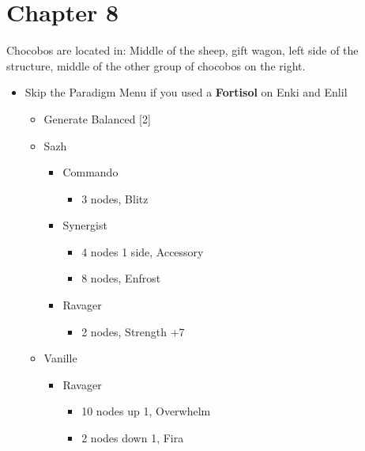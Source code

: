 \chapter{Chapter 8}

	Chocobos are located in: Middle of the sheep, gift wagon, left side of the structure, middle of the other group of chocobos on the right.
	\begin{menu}
		\begin{itemize}
			\item Skip the Paradigm Menu if you used a \textbf{Fortisol} on Enki and Enlil
			      \paradigm
			      \begin{itemize}
			      		\item Generate Balanced [2]
			      \end{itemize}
			      \crystarium
			      \begin{itemize}
				      \item Sazh
				            \begin{itemize}
					            \item Commando
					                  \begin{itemize}
						                  \item 3 nodes, Blitz
					                  \end{itemize}
					            \item Synergist
					                  \begin{itemize}
						                  \item 4 nodes 1 side, Accessory
						                  \item 8 nodes, Enfrost
					                  \end{itemize}
					            \item Ravager
					                  \begin{itemize}
						                  \item 2 nodes, Strength +7
					                  \end{itemize}
				            \end{itemize}
				      \item Vanille
				            \begin{itemize}
					            \item Ravager
					                  \begin{itemize}
						                  \item 10 nodes up 1, Overwhelm
						                  \item 2 nodes down 1, Fira

\end{itemize}
\end{itemize}
\end{itemize}
\end{itemize}
\end{menu}
